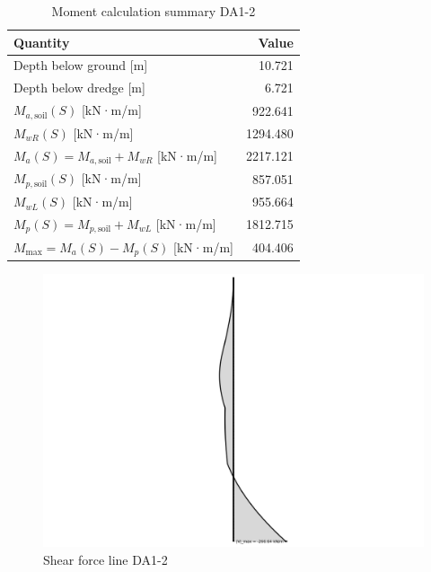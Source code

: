 \begin{table}[H]
  \centering
  \caption{Moment calculation summary DA1-2}
  \label{tab:moment_summary}
  \small
  \setlength{\tabcolsep}{8pt}
  \renewcommand{\arraystretch}{1.15}
  \begin{tabular}{@{}l r@{}}
    \toprule
    Quantity & Value \\
    \midrule
    Depth below ground [m] & 10.721 \\
    Depth below dredge [m] & 6.721 \\
    $M_{a,\text{soil}}(S)$ [kN·m/m] & 922.641 \\
    $M_{wR}(S)$ [kN·m/m] & 1294.480 \\
    $M_{a}(S) = M_{a,\text{soil}} + M_{wR}$ [kN·m/m] & 2217.121 \\
    $M_{p,\text{soil}}(S)$ [kN·m/m] & 857.051 \\
    $M_{wL}(S)$ [kN·m/m] & 955.664 \\
    $M_{p}(S) = M_{p,\text{soil}} + M_{wL}$ [kN·m/m] & 1812.715 \\
    $M_{\text{max}} = M_{a}(S) - M_{p}(S)$ [kN·m/m] & 404.406 \\
    \bottomrule
  \end{tabular}
\end{table}

\begin{figure}[H]
    \centering
    \includegraphics[width=0.80\linewidth]{figures/appendix-i/shear_max_10172.png}
    \caption{Shear force line DA1-2}
    \label{fig:appendix_shear_forces_DA1_2}
\end{figure}

